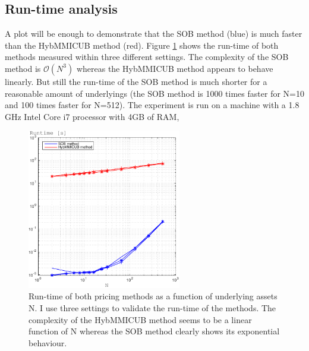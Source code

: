\documentclass[a4paper]{article}
\begin{document}
\subsection{Run-time analysis}
\label{rt}
A plot will be enough to demonstrate that the SOB method (blue) is much faster than the HybMMICUB method (red). Figure \ref{fig:rt} shows the run-time of both methods measured within three different settings. The complexity of the SOB method is $\mathcal{O}(N^3)$ whereas the HybMMICUB method appears to behave linearly. But still the run-time of the SOB method is much shorter for a reasonable amount of underlyings (the SOB method is 1000 times faster for N=10 and 100 times faster for N=512). The experiment is run on a machine with a 1.8 GHz Intel Core i7 processor with 4GB of RAM,
\begin{figure}[h!]
	\centering
	\captionsetup{width=.6\linewidth}
	\includegraphics[width=0.6\textwidth]{graphics/runtime.pdf}
	\caption{Run-time of both pricing methods as a function of underlying assets N. I use three settings to validate the run-time of the methods. The complexity of 		the HybMMICUB method seems to be a linear function of N whereas the SOB method clearly shows its exponential behaviour.}
	\label{fig:rt}
\end{figure}
\end{document}
